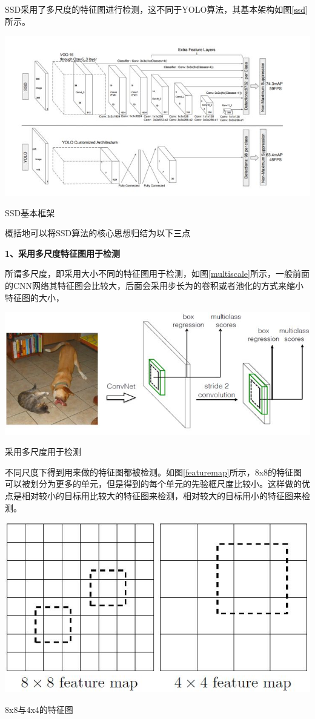 SSD采用了多尺度的特征图进行检测，这不同于YOLO算法，其基本架构如图\ref{ssd}所示。
\begin{uscfigure}
	\includegraphics[width=\textwidth]{./Pictures/ssd_modual.jpg}	
	\caption{SSD基本框架}
	\label{ssd}
\end{uscfigure}


概括地可以将SSD算法的核心思想归结为以下三点

\textbf{1、采用多尺度特征图用于检测 }

所谓多尺度，即采用大小不同的特征图用于检测，如图\ref{multiscale}所示，一般前面的CNN网络其特征图会比较大，后面会采用步长为的卷积或者池化的方式来缩小特征图的大小，
\begin{uscfigure}
	\includegraphics[width=\textwidth]{./Pictures/ssd_(1).jpg}	
	\caption{采用多尺度用于检测}
	\label{multiscale}
\end{uscfigure}
不同尺度下得到用来做的特征图都被检测。如图\ref{featuremap}所示，8x8的特征图可以被划分为更多的单元，但是得到的每个单元的先验框尺度比较小。这样做的优点是相对较小的目标用比较大的特征图来检测，相对较大的目标用小的特征图来检测。
\begin{uscfigure}
	\includegraphics[width=\textwidth]{./Pictures/ssd_(2).jpg}	
	\caption{8x8与4x4的特征图}
	\label{featuremap}
\end{uscfigure}

